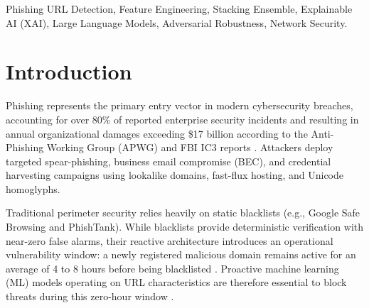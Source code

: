 \documentclass[conference]{IEEEtran}
\begin{document}
\begin{IEEEkeywords}
Phishing URL Detection, Feature Engineering, Stacking Ensemble, Explainable AI (XAI), Large Language Models, Adversarial Robustness, Network Security.
\end{IEEEkeywords}

\section{Introduction}
Phishing represents the primary entry vector in modern cybersecurity breaches, accounting for over 80\% of reported enterprise security incidents and resulting in annual organizational damages exceeding \$17 billion according to the Anti-Phishing Working Group (APWG) and FBI IC3 reports \cite{apwg2025, fbi2025}. Attackers deploy targeted spear-phishing, business email compromise (BEC), and credential harvesting campaigns using lookalike domains, fast-flux hosting, and Unicode homoglyphs.

Traditional perimeter security relies heavily on static blacklists (e.g., Google Safe Browsing and PhishTank). While blacklists provide deterministic verification with near-zero false alarms, their reactive architecture introduces an operational vulnerability window: a newly registered malicious domain remains active for an average of 4 to 8 hours before being blacklisted \cite{whittaker2010large}. Proactive machine learning (ML) models operating on URL characteristics are therefore essential to block threats during this zero-hour window \cite{mohammad2014, basnet2014rule}.
\end{document}
